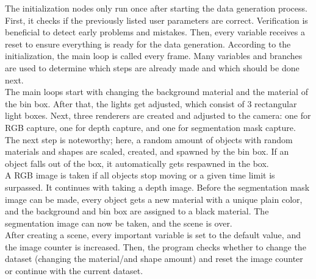 		The initialization nodes only run once after starting the data generation process. First, it checks if the previously listed user parameters are correct. Verification is beneficial to detect early problems and mistakes. Then, every variable receives a reset to ensure everything is ready for the data generation. %
		According to the initialization, the main loop is called every frame. Many variables and branches are used to determine which steps are already made and which should be done next.\\
		The main loops start with changing the background material and the material of the bin box. After that, the lights get adjusted, which consist of 3 rectangular light boxes. Next, three renderers are created and adjusted to the camera: one for RGB capture, one for depth capture, and one for segmentation mask capture. The next step is noteworthy; here, a random amount of objects with random materials and shapes are scaled, created, and spawned by the bin box. If an object falls out of the box, it automatically gets respawned in the box. \\
		A RGB image is taken if all objects stop moving or a given time limit is surpassed. It continues with taking a depth image. Before the segmentation mask image can be made, every object gets a new material with a unique plain color, and the background and bin box are assigned to a black material. The segmentation image can now be taken, and the scene is over.\\ %
		After creating a scene, every important variable is set to the default value, and the image counter is increased. Then, the program checks whether to change the dataset (changing the material/and shape amount) and reset the image counter or continue with the current dataset. \\%
